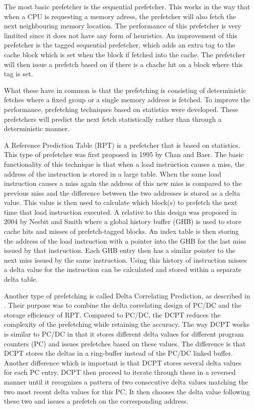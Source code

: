 The most basic prefetcher is the sequential prefetcher. This works in the way that when a CPU is requesting a memory adress, the prefetcher will also fetch the next neighbouring memory location. The performance of this prefetcher is very limtited since it does not have any form of heuristics. An improvement of this prefetcher is the tagged sequential prefetcher, which adds an extra tag to the cache block which is set when the block if fetched into the cache. The prefetcher will then issue a prefetch based on if there is a chache hit on a block where this tag is set.

What these have in common is that the prefetching is consisting of deterministic fetches where a fixed group or a single memory address is fetched. To improve the performance, prefetching techniques based on statistics were developed. These prefetchers will predict the next fetch statistically rather than through a deterministic manner.   

A Reference Prediction Table (RPT) is a prefetcher that is based on statistics. This type of prefetcher was first proposed in 1995 by Chan and Baer. The basic functionality of this technique is that when a load instruction causes a miss, the address of the instruction is stored in a large table. When the same load instruction causes a miss again the address of this new miss is compared to the previous miss and the difference between the two addresses is stored as a delta value. This value is then used to calculate which block(s) to prefetch the next time that load instruction executed. 
A relative to this design was proposed in 2004 by Nesbit and Smith where a global history buffer (GHB) is used to store cache hits and misses of prefetch-tagged blocks. An index table is then storing the address of the load instruction with a pointer into the GHB for the last miss issued by that instruction. Each GHB entry then has a similar pointer to the next miss issued by the same instruction. Using this history of instruction misses a delta value for the instruction can be calculated and stored within  a separate delta table.

Another type of prefetching is called Delta Correlating Prediction, as described in \cite{reference:jahre}. Their purpose was to combine the delta correlating design of PC/DC and the storage efficiency of RPT. Compared to PC/DC, the DCPT reduces the complexity of the prefetching while retaining the accuracy.
The way DCPT works is similar to PC/DC in that it stores different delta values for different program counters (PC) and issues prefetches based on these values. The difference is that DCPT stores the deltas in a ring-buffer instead of the PC/DC linked buffer. Another difference which is important is that DCPT stores several delta values for each PC entry. DCPT then proceed to iterate through these in a reversed manner until it recognizes a pattern of two consecutive delta values matching the two most recent delta values for this PC. It then chooses the delta value following these two and issues a prefetch on the corresponding address.
